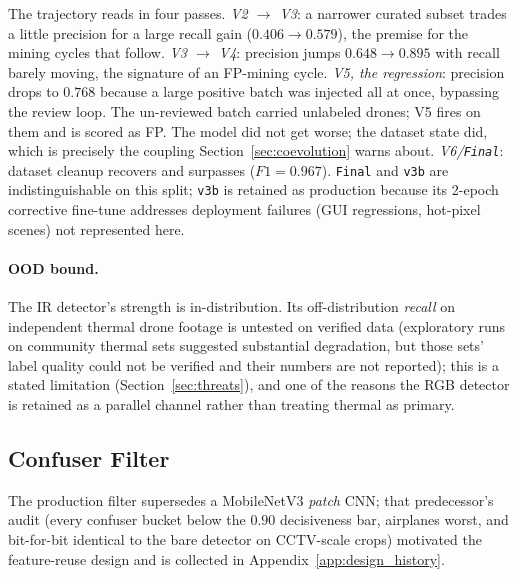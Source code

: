 The trajectory reads in four passes. \emph{V2 $\to$ V3}: a narrower curated subset trades a little precision for a large recall gain ($0.406 \to 0.579$), the premise for the mining cycles that follow. \emph{V3 $\to$ V4}: precision jumps $0.648 \to 0.895$ with recall barely moving, the signature of an FP-mining cycle. \emph{V5, the regression}: precision drops to $0.768$ because a large positive batch was injected all at once, bypassing the review loop. The un-reviewed batch carried unlabeled drones; V5 fires on them and is scored as FP. The model did not get worse; the dataset state did, which is precisely the coupling Section~\ref{sec:coevolution} warns about. \emph{V6/\texttt{Final}}: dataset cleanup recovers and surpasses ($F1=0.967$). \texttt{Final} and \texttt{v3b} are indistinguishable on this split; \texttt{v3b} is retained as production because its 2-epoch corrective fine-tune addresses deployment failures (GUI regressions, hot-pixel scenes) not represented here.

\paragraph{OOD bound.} The IR detector's strength is in-distribution. Its off-distribution \emph{recall} on independent thermal drone footage is untested on verified data (exploratory runs on community thermal sets suggested substantial degradation, but those sets' label quality could not be verified and their numbers are not reported); this is a stated limitation (Section~\ref{sec:threats}), and one of the reasons the RGB detector is retained as a parallel channel rather than treating thermal as primary.

\subsection{Confuser Filter}
\label{sec:verifier_results}
\label{sec:patch_threshold}
\label{sec:patch_audit}

The production filter supersedes a MobileNetV3 \emph{patch} CNN; that predecessor's audit (every confuser bucket below the $0.90$ decisiveness bar, airplanes worst, and bit-for-bit identical to the bare detector on CCTV-scale crops) motivated the feature-reuse design and is collected in Appendix~\ref{app:design_history}.

